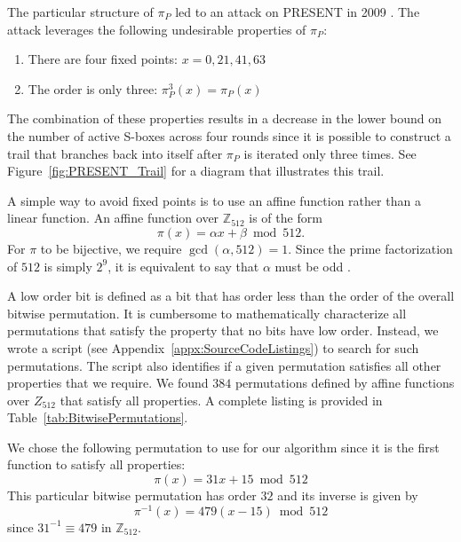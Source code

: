 The particular structure of $\pi_P$ led to an attack on PRESENT in 2009 \cite{Nakahara2009_PRESENT_Cryptanalysis}.
The attack leverages the following undesirable properties of $\pi_P$:
\begin{enumerate}
\item There are four fixed points: $x = 0, 21, 41, 63$
\item The order is only three: $\pi_P^3(x) = \pi_P(x)$
\end{enumerate}
The combination of these properties results in a decrease in the lower bound on the number of active S-boxes across four rounds since it is possible to construct a trail that branches back into itself after $\pi_P$ is iterated only three times.
See Figure~\ref{fig:PRESENT_Trail} for a diagram that illustrates this trail.

A simple way to avoid fixed points is to use an affine function rather than a linear function.
An affine function over $\mathbb{Z}_{512}$ is of the form
\begin{equation*}
\pi(x) = \alpha x + \beta \bmod{512}.
\end{equation*}
For $\pi$ to be bijective, we require $\gcd(\alpha, 512) = 1$.
Since the prime factorization of $512$ is simply $2^9$, it is equivalent to say that $\alpha$ must be odd \cite{Stinson2006_CTAP}.

A low order bit is defined as a bit that has order less than the order of the overall bitwise permutation.
It is cumbersome to mathematically characterize all permutations that satisfy the property that no bits have low order. Instead, we wrote a script (see Appendix~\ref{appx:SourceCodeListings}) to search for such permutations.
The script also identifies if a given permutation satisfies all other properties that we require.
We found $384$ permutations defined by affine functions over $Z_{512}$ that satisfy all properties. A complete listing is provided in Table~\ref{tab:BitwisePermutations}.

We chose the following permutation to use for our algorithm since it is the first function to satisfy all properties:
\begin{equation*}
\pi(x) = 31x + 15 \bmod{512}
\end{equation*}
This particular bitwise permutation has order $32$ and its inverse is given by
\begin{equation*}
\pi^{-1}(x) = 479(x-15) \bmod{512}
\end{equation*}
since $31^{-1} \equiv 479$ in $\mathbb{Z}_{512}$.

